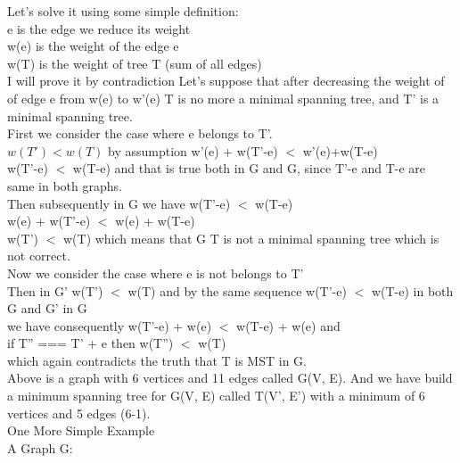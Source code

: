\documentclass{article}
\begin{document}
\begin{enumerate}
Let's solve it using some simple definition:\\
e is the edge we reduce its weight\\
w(e) is the weight of the edge e\\
w(T) is the weight of tree T (sum of all edges)\\

I will prove it by contradiction Let's suppose that after decreasing the weight of of edge e from w(e) to w'(e) T is no more a minimal spanning tree, and T' is a minimal spanning tree.\\

First we consider the case where e belongs to T'.\\
$w(T')<w(T)$ by assumption w'(e) + w(T'-e) $<$ w'(e)+w(T-e)\\
w(T'-e) $<$ w(T-e) and that is true both in G and G, since {T'-e} and {T-e} are same in both graphs.\\
Then subsequently in G we have w(T'-e) $<$ w(T-e)\\
w(e) + w(T'-e) $<$ w(e) + w(T-e)\\
w(T') $<$ w(T) which means that G T is not a minimal spanning tree which is not correct.\\

Now we consider the case where e is not belongs to T'\\
Then in G' w(T') $<$ w(T) and by the same sequence w(T'-e) $<$ w(T-e) in both G and G' in G \\
we have consequently w(T'-e) + w(e) $<$ w(T-e) + w(e) and \\
if T'' === {T' + e} then w(T'') $<$ w(T) \\
which again contradicts the truth that T is MST in G.\\ 
 
Above is a graph with 6 vertices and 11 edges called G(V, E). And we have build a minimum spanning tree for G(V, E) called T(V', E') with a minimum of 6 vertices and 5 edges (6-1). \\

One More Simple Example\\
A Graph G:\\


\end{enumerate}
\end{document}
